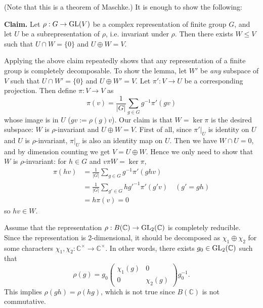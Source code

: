 \begin{problem}
(Note that this is a theorem of Maschke.)
It is enough to show the following:

\textbf{Claim.} Let $\rho: G \to \operatorname{\mathrm{GL}}(V)$ be a complex representation of finite group $G$, and let $U$ be a subrepresentation of $\rho$,
i.e. invariant under $\rho$.
Then there exists $W \leq V$ such that $U \cap W = \{0\}$ and $U \oplus W = V$.

Applying the above claim repeatedly shows that any representation of a finite group is completely decomposable.
To show the lemma, let $W'$ be \emph{any} subspace of $V$ such that $U \cap W' = \{0\}$ and $U \oplus W' = V$.
Let $\pi': V \to U$ be a corresponding projection.
Then define $\pi: V \to V$ as
$$
\pi(v) = \frac{1}{|G|} \sum_{g \in G} g^{-1} \pi'(gv)
$$
whose image is in $U$ ($gv:=\rho(g)v$).
Our claim is that $W = \ker\pi$ is the desired subspace: $W$ is $\rho$-invariant and $U \oplus W = V$.
First of all, since $\pi'|_U$ is identity on $U$ and $U$ is $\rho$-invariant, $\pi|_U$ is also an identity map on $U$.
Then we have $W \cap U = 0$, and by dimension counting we get $V = U \oplus W$.
Hence we only need to show that $W$ is $\rho$-invariant: for $h \in G$ and $v \pi W = \ker \pi$, 
\begin{align*}
    \pi(hv) &= \frac{1}{|G|} \sum_{g \in G} g^{-1} \pi'(ghv) \\
    &= \frac{1}{|G|} \sum_{g' \in G} hg'^{-1}\pi'(g'v) \quad (g' =gh) \\
    &= h \pi(v) = 0
\end{align*}
so $hv \in W$.
\end{problem}

\begin{problem}
Assume that the representation $\rho: B(\mathbb{C}) \to \operatorname{\mathrm{GL}}_{2}(\mathbb{C})$ is completely reducible.
Since the representation is 2-dimensional, it should be decomposed as $\chi_{1} \oplus \chi_{2}$ for some 
characters $\chi_1, \chi_2 : \mathbb{C}^{\times} \to \mathbb{C}^{\times}$.
In other words, there exists $g_{0} \in \operatorname{\mathrm{GL}}_{2}(\mathbb{C})$ such that
$$
\rho(g) = g_{0} \begin{pmatrix}
    \chi_1(g) & 0 \\ 0 & \chi_2(g)
\end{pmatrix} g_{0}^{-1}.
$$
This implies $\rho(gh) = \rho(hg)$, which is not true since $B(\mathbb{C})$ is not commutative.
\end{problem}

